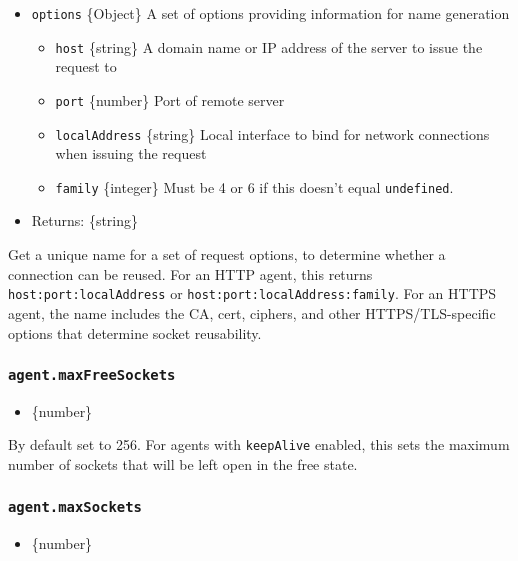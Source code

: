 \begin{itemize}
\tightlist
\item
  \texttt{options} \{Object\} A set of options providing information for
  name generation

  \begin{itemize}
  \tightlist
  \item
    \texttt{host} \{string\} A domain name or IP address of the server
    to issue the request to
  \item
    \texttt{port} \{number\} Port of remote server
  \item
    \texttt{localAddress} \{string\} Local interface to bind for network
    connections when issuing the request
  \item
    \texttt{family} \{integer\} Must be 4 or 6 if this doesn't equal
    \texttt{undefined}.
  \end{itemize}
\item
  Returns: \{string\}
\end{itemize}

Get a unique name for a set of request options, to determine whether a
connection can be reused. For an HTTP agent, this returns
\texttt{host:port:localAddress} or
\texttt{host:port:localAddress:family}. For an HTTPS agent, the name
includes the CA, cert, ciphers, and other HTTPS/TLS-specific options
that determine socket reusability.

\subsubsection{\texorpdfstring{\texttt{agent.maxFreeSockets}}{agent.maxFreeSockets}}\label{agent.maxfreesockets}

\begin{itemize}
\tightlist
\item
  \{number\}
\end{itemize}

By default set to 256. For agents with \texttt{keepAlive} enabled, this
sets the maximum number of sockets that will be left open in the free
state.

\subsubsection{\texorpdfstring{\texttt{agent.maxSockets}}{agent.maxSockets}}\label{agent.maxsockets}

\begin{itemize}
\tightlist
\item
  \{number\}
\end{itemize}

